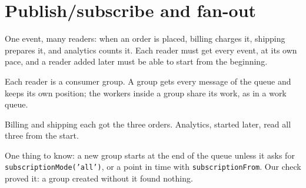 %

\section{Publish/subscribe and fan-out}

One event, many readers: when an order is placed, billing charges it, shipping prepares it, and
analytics counts it. Each reader must get every event, at its own pace, and a reader added later
must be able to start from the beginning.

Each reader is a consumer group. A group gets every message of the queue and keeps its own
position; the workers inside a group share its work, as in a work queue.



Billing and shipping each got the three orders. Analytics, started later, read all three from the
start.


One thing to know: a new group starts at the end of the queue unless it asks for
\texttt{subscriptionMode('all')}, or a point in time with \texttt{subscriptionFrom}. Our check
proved it: a group created without it found nothing.
